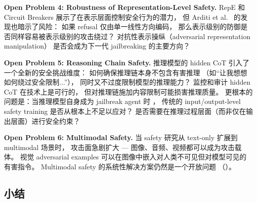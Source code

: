 \begin{openproblembox}
\textbf{Open Problem 4: Robustness of Representation-Level Safety.}
RepE 和 Circuit Breakers 展示了在表示层面控制安全行为的潜力，
但 Arditi et al.\ \cite{arditi2024refusal} 的发现也暗示了风险：
如果 refusal 仅由单一线性方向编码，
那么表示级别的防御是否同样容易被表示级别的攻击绕过？
对抗性表示操纵（adversarial representation manipulation）
是否会成为下一代 jailbreaking 的主要方向？
\end{openproblembox}

\begin{openproblembox}
\textbf{Open Problem 5: Reasoning Chain Safety.}
推理模型的 hidden CoT 引入了一个全新的安全挑战维度：
如何确保推理链本身不包含有害推理
（如``让我想想如何绕过安全限制...''），
同时又不过度限制模型的推理能力？
监控和审计 hidden CoT 在技术上是可行的，
但对推理链施加内容限制可能损害推理质量。
更根本的问题是：当推理模型自身成为 jailbreak agent 时
\cite{hagendorff2026jailbreakagents}，
传统的 input/output-level safety training 是否从根本上不足以应对？
是否需要在推理过程层面（而非仅在输出层面）进行安全约束？
\end{openproblembox}

\begin{openproblembox}
\textbf{Open Problem 6: Multimodal Safety.}
当 safety 研究从 text-only 扩展到 multimodal 场景时，
攻击面急剧扩大 --- 图像、音频、视频都可以成为攻击载体。
视觉 adversarial examples 可以在图像中嵌入对人类不可见但对模型可见的有害指令。
Multimodal safety 的系统性解决方案仍然是一个开放问题
（）。
\end{openproblembox}

\subsection{小结}

